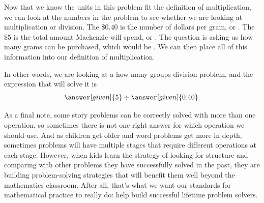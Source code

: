 \documentclass{ximera}
\begin{document}
\begin{example}
Now that we know the units in this problem fit the definition of multiplication, we can look at the numbers in the problem to see whether we are looking at multiplication or division. The $\$0.40$ is the number of dollars per gram, or . The $\$5$ is the total amount Mackenzie will spend, or . The question is asking us how many grams can be purchased, which would be . We can then place all of this information into our definition of multiplication.
\begin{image}
\end{image}
In other words, we are looking at a how many groups division problem, and the expression that will solve it is 
\[
\answer[given]{5} \div \answer[given]{0.40}.
\]

\end{example}

As a final note, some story problems can be correctly solved with more than one operation, so sometimes there is not one right answer for which operation we should use. And as children get older and word problems get more in depth, sometimes problems will have multiple stages that require different operations at each stage. However, when kids learn the strategy of looking for structure and comparing with other problems they have successfully solved in the past, they are building problem-solving strategies that will benefit them well beyond the mathematics classroom. After all, that's what we want our standards for mathematical practice to really do: help build successful lifetime problem solvers.
\end{document}
